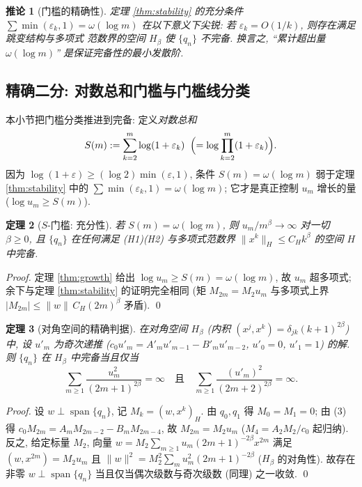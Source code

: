 \documentclass[UTF8]{ctexart}
\newtheorem{theorem}{定理}[section]
\newtheorem{corollary}[theorem]{推论}
\begin{document}
\begin{corollary}[门槛的精确性]
	定理 \ref{thm:stability} 的充分条件 $\sum \min(\varepsilon_k,1) = \omega(\log m)$
	在以下意义下尖锐: 若 $\varepsilon_k = O(1/k)$, 则存在满足跳变结构与多项式
	范数界的空间 $H_\beta$ 使 $\{q_n\}$ 不完备. 换言之, ``累计超出量 $\omega(\log m)$''
	是保证完备性的最小发散阶.
\end{corollary}


\subsection{精确二分: 对数总和门槛与门槛线分类}

本小节把门槛分类推进到完备: 定义\emph{对数总和}
\begin{equation}
	S(m) := \sum_{k=2}^{m} \log(1+\varepsilon_k)
	\;\; \Bigl(= \log \prod_{k=2}^m (1+\varepsilon_k)\Bigr).
\end{equation}
因为 $\log(1+\varepsilon) \geq (\log 2)\min(\varepsilon,1)$, 条件
$S(m) = \omega(\log m)$ 弱于定理 \ref{thm:stability} 中的
$\sum\min(\varepsilon_k,1) = \omega(\log m)$; 它才是真正控制
$u_m$ 增长的量 ($\log u_m \geq S(m)$).

\begin{theorem}[$S$-门槛: 充分性]\label{thm:Sthr}
	若 $S(m) = \omega(\log m)$, 则 $u_m/m^\beta \to \infty$ 对一切
	$\beta \geq 0$, 且 $\{q_n\}$ 在任何满足 (H1)(H2) 与多项式范数界
	$\|x^k\|_H \leq C_H k^\beta$ 的空间 $H$ 中完备.
\end{theorem}

\begin{proof}
	定理 \ref{thm:growth} 给出 $\log u_m \geq S(m) = \omega(\log m)$,
	故 $u_m$ 超多项式; 余下与定理 \ref{thm:stability} 的证明完全相同
	(矩 $M_{2m} = M_2 u_m$ 与多项式上界 $|M_{2m}| \leq \|w\|\,C_H(2m)^\beta$
	矛盾). \qed
\end{proof}

\begin{theorem}[对角空间的精确判据]\label{thm:exact}
	在对角空间 $H_\beta$ (内积 $(x^j,x^k) = \delta_{jk}(k+1)^{2\beta}$) 中,
	设 $u'_m$ 为奇次递推 ($c_0 u'_m = A'_m u'_{m-1} - B'_m u'_{m-2}$,
	$u'_0=0$, $u'_1=1$) 的解. 则 $\{q_n\}$ 在 $H_\beta$ 中完备当且仅当
	\begin{equation}
		\sum_{m \geq 1} \frac{u_m^2}{(2m+1)^{2\beta}} = \infty
		\quad\text{且}\quad
		\sum_{m \geq 1} \frac{(u'_m)^2}{(2m+2)^{2\beta}} = \infty.
	\end{equation}
\end{theorem}

\begin{proof}
	设 $w \perp \operatorname{span}\{q_n\}$, 记 $M_k = (w, x^k)_H$.
	由 $q_0, q_1$ 得 $M_0 = M_1 = 0$; 由 (3) 得
	$c_0 M_{2m} = A_m M_{2m-2} - B_m M_{2m-4}$, 故 $M_{2m} = M_2 u_m$
	($M_4 = A_2 M_2/c_0$ 起归纳). 反之, 给定标量 $M_2$, 向量
	$w = M_2 \sum_{m \geq 1} u_m (2m+1)^{-2\beta} x^{2m}$ 满足
	$(w, x^{2m}) = M_2 u_m$ 且 $\|w\|^2 = M_2^2 \sum_m u_m^2 (2m+1)^{-2\beta}$
	($H_\beta$ 的对角性). 故存在非零 $w \perp \operatorname{span}\{q_n\}$
	当且仅当偶次级数与奇次级数 (同理) 之一收敛. \qed
\end{proof}
\end{document}
